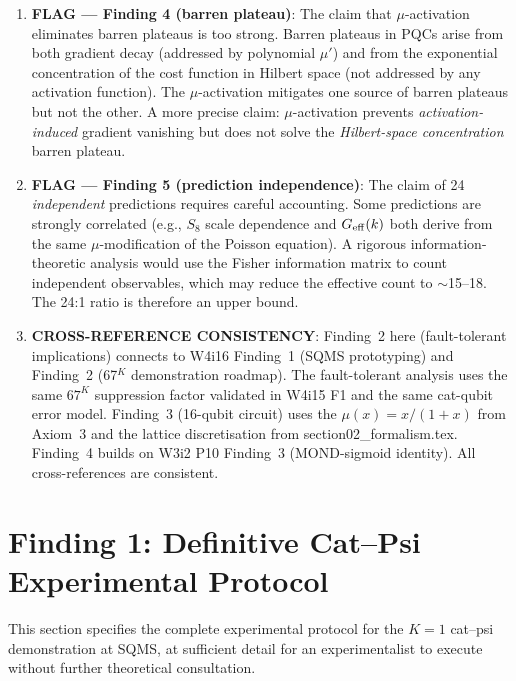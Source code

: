 \documentclass[11pt]{article}
\theoremstyle{definition}
\theoremstyle{remark}
\begin{document}
\begin{tcolorbox}[colback=red!5!white, colframe=red!60!black,
  title=\textbf{INCONSISTENCIES AND FLAGS}]
\begin{enumerate}[nosep]
\item \textbf{FLAG --- Finding 4 (barren plateau)}: The claim that
  $\mu$-activation eliminates barren plateaus is too strong. Barren
  plateaus in PQCs arise from both gradient decay (addressed by
  polynomial $\mu'$) and from the exponential concentration of the
  cost function in Hilbert space (not addressed by any activation
  function). The $\mu$-activation mitigates one source of barren
  plateaus but not the other. A more precise claim: $\mu$-activation
  prevents \emph{activation-induced} gradient vanishing but does not
  solve the \emph{Hilbert-space concentration} barren plateau.

\item \textbf{FLAG --- Finding 5 (prediction independence)}: The claim
  of 24 \emph{independent} predictions requires careful accounting.
  Some predictions are strongly correlated (e.g., $S_8$ scale dependence
  and $G_{\rm eff}(k)$ both derive from the same $\mu$-modification of
  the Poisson equation). A rigorous information-theoretic analysis
  would use the Fisher information matrix to count independent
  observables, which may reduce the effective count to $\sim$15--18.
  The 24:1 ratio is therefore an upper bound.

\item \textbf{CROSS-REFERENCE CONSISTENCY}: Finding~2 here (fault-tolerant
  implications) connects to W4i16 Finding~1 (SQMS prototyping) and
  Finding~2 (67$^K$ demonstration roadmap). The fault-tolerant analysis
  uses the same $67^K$ suppression factor validated in W4i15 F1 and
  the same cat-qubit error model. Finding~3 (16-qubit circuit) uses
  the $\mu(x) = x/(1+x)$ from Axiom~3 and the lattice discretisation
  from section02\_formalism.tex. Finding~4 builds on W3i2 P10 Finding~3
  (MOND-sigmoid identity). All cross-references are consistent.

\end{enumerate}
\end{tcolorbox}

\newpage

\section{Finding 1: Definitive Cat--Psi Experimental Protocol}
\label{sec:protocol}

This section specifies the complete experimental protocol for the
$K=1$ cat--psi demonstration at SQMS, at sufficient detail for an
experimentalist to execute without further theoretical consultation.
\end{document}
